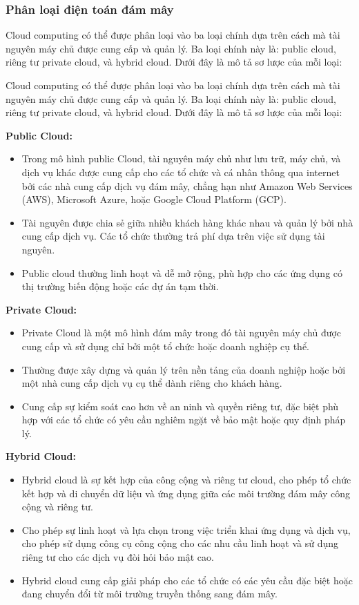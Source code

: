 \subsubsection{Phân loại điện toán đám mây}

Cloud computing có thể được phân loại vào ba loại chính dựa trên cách mà tài nguyên máy chủ được cung cấp và quản lý. Ba loại chính này là: public cloud, riêng tư private cloud, và hybrid cloud. Dưới đây là mô tả sơ lược của mỗi loại:

Cloud computing có thể được phân loại vào ba loại chính dựa trên cách mà tài nguyên máy chủ được cung cấp và quản lý. Ba loại chính này là: public cloud, riêng tư private cloud, và hybrid cloud. Dưới đây là mô tả sơ lược của mỗi loại:

\textbf{Public Cloud:}
\begin{itemize}
\item Trong mô hình public Cloud, tài nguyên máy chủ như lưu trữ, máy chủ, và dịch vụ khác được cung cấp cho các tổ chức và cá nhân thông qua internet bởi các nhà cung cấp dịch vụ đám mây, chẳng hạn như Amazon Web Services (AWS), Microsoft Azure, hoặc Google Cloud Platform (GCP).
\item Tài nguyên được chia sẻ giữa nhiều khách hàng khác nhau và quản lý bởi nhà cung cấp dịch vụ. Các tổ chức thường trả phí dựa trên việc sử dụng tài nguyên.
\item Public cloud thường linh hoạt và dễ mở rộng, phù hợp cho các ứng dụng có thị trường biến động hoặc các dự án tạm thời.
\end{itemize}

\textbf{Private Cloud:}
\begin{itemize}
\item Private Cloud là một mô hình đám mây trong đó tài nguyên máy chủ được cung cấp và sử dụng chỉ bởi một tổ chức hoặc doanh nghiệp cụ thể.
\item Thường được xây dựng và quản lý trên nền tảng của doanh nghiệp hoặc bởi một nhà cung cấp dịch vụ cụ thể dành riêng cho khách hàng.
\item Cung cấp sự kiểm soát cao hơn về an ninh và quyền riêng tư, đặc biệt phù hợp với các tổ chức có yêu cầu nghiêm ngặt về bảo mật hoặc quy định pháp lý.
\end{itemize}

\textbf{Hybrid Cloud:}
\begin{itemize}
\item Hybrid cloud là sự kết hợp của công cộng và riêng tư cloud, cho phép tổ chức kết hợp và di chuyển dữ liệu và ứng dụng giữa các môi trường đám mây công cộng và riêng tư.
\item Cho phép sự linh hoạt và lựa chọn trong việc triển khai ứng dụng và dịch vụ, cho phép sử dụng công cụ công cộng cho các nhu cầu linh hoạt và sử dụng riêng tư cho các dịch vụ đòi hỏi bảo mật cao.
\item Hybrid cloud cung cấp giải pháp cho các tổ chức có các yêu cầu đặc biệt hoặc đang chuyển đổi từ môi trường truyền thống sang đám mây.
\end{itemize}
